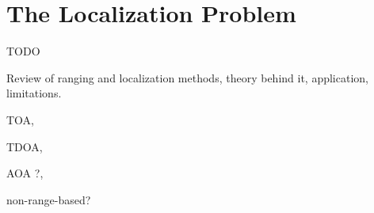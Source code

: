 %
%

\section{The Localization Problem}
\label{chapter:problem}


TODO

Review of ranging and localization methods, theory behind it, application, limitations. 

TOA,
 
TDOA,

AOA ?,

non-range-based? 

